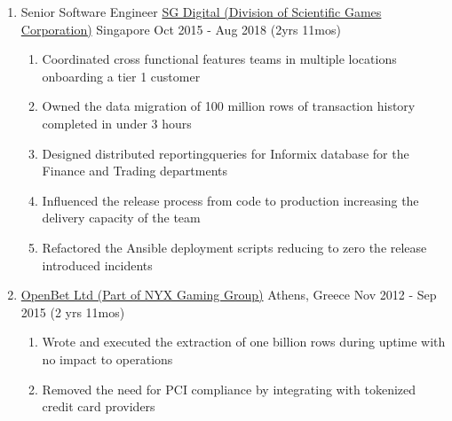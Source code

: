\documentclass{CVSoftwareEngineer}
\begin{document}
\begin{enumerate}[labelwidth=!, labelindent=0pt, leftmargin=*, rightmargin=15pt]
		\item[] \cvExperience
			{Senior Software Engineer}
			{\href{https://www.sgdigital.com/}{SG Digital (Division of Scientific Games Corporation)}}
			{Singapore}
			{Oct 2015 - Aug 2018 (2yrs 11mos)}
			{
				\begin{enumerate}[labelwidth=!, labelindent=0pt, nosep, leftmargin=*]
					\item[\textasteriskcentered] Coordinated cross functional features teams
						in multiple locations onboarding a tier 1 customer
					\item[\textasteriskcentered] Owned the data migration of 100 million rows of
						transaction history completed in under 3 hours
					\item[\textasteriskcentered] Designed distributed reportingqueries for Informix
						database for the Finance and Trading departments
					\item[\textasteriskcentered] Influenced the release process from code to
						production increasing the delivery capacity of the team
					\item[\textasteriskcentered] Refactored the Ansible deployment scripts
						reducing to zero the release introduced incidents
				\end{enumerate}
			}

		\item[]  
			{\href{http://www.openbet.com}{OpenBet Ltd (Part of NYX Gaming Group)}}
			{Athens, Greece}
			{Nov 2012 - Sep 2015 (2 yrs 11mos)}
			{
				\begin{enumerate}[labelwidth=!, labelindent=0pt, nosep, leftmargin=*]
					\item[\textasteriskcentered] Wrote and executed the extraction of
						one billion rows during uptime with no impact to operations
					\item[\textasteriskcentered] Removed the need for PCI compliance by
						integrating with tokenized credit card providers
				\end{enumerate}
			}
	\end{enumerate}
\end{document}
